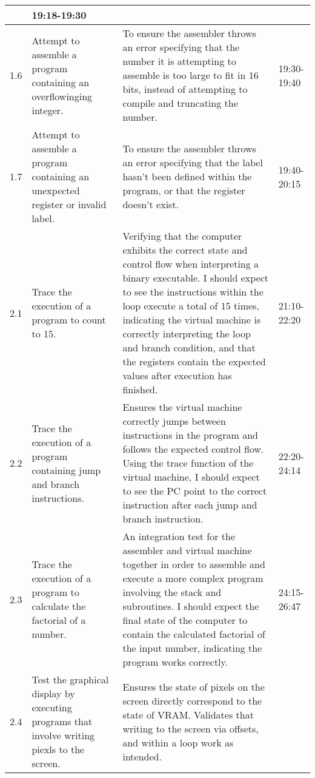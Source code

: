 \begin{longtable}{|p{1cm}|p{5cm}|p{5cm}|p{2cm}|}
        & 
        19:18-19:30
        \\
    \hline
        1.6
        & 
        Attempt to assemble a program containing an overflowinging integer.
        &
        To ensure the assembler throws an error specifying that the number it is attempting to assemble is too large to fit in 16 bits, instead of attempting to compile and truncating the number.  
        & 
        19:30-19:40
        \\
    \hline
        1.7
        & 
        Attempt to assemble a program containing an unexpected register or invalid label.
        &
        To ensure the assembler throws an error specifying that the label hasn't been defined within the program, or that the register doesn't exist. 
        & 
        19:40-20:15
        \\
    \hline
        2.1
        & 
        Trace the execution of a program to count to 15.
        &
        Verifying that the computer exhibits the correct state and control flow when interpreting a binary executable. I should expect to see the instructions within the loop execute a total of 15 times, indicating the virtual machine is correctly interpreting the loop and branch condition, and that the registers contain the expected values after execution has finished. 
        & 
        21:10-22:20
        \\
    \hline
        2.2
        & 
        Trace the execution of a program containing jump and branch instructions.
        &
        Ensures the virtual machine correctly jumps between instructions in the program and follows the expected control flow. Using the trace function of the virtual machine, I should expect to see the PC point to the correct instruction after each jump and branch instruction. 
        & 
        22:20-24:14
        \\
    \hline
        2.3
        & 
        Trace the execution of a program to calculate the factorial of a number.
        &
        An integration test for the assembler and virtual machine together in order to assemble and execute a more complex program involving the stack and subroutines. I should expect the final state of the computer to contain the calculated factorial of the input number, indicating the program works correctly. 
        & 
        24:15-26:47
        \\
    \hline
        2.4
        & 
        Test the graphical display by executing programs that involve writing piexls to the screen.
        &
        Ensures the state of pixels on the screen directly correspond to the state of VRAM. Validates that writing to the screen via offsets, and within a loop work as intended.

\end{longtable}
